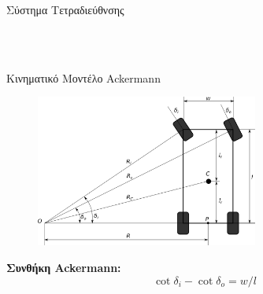 \documentclass[10pt, compress, handout]{beamer} %
\begin{document}
\begin{frame}{Σύστημα Τετραδιεύθνσης}
	\begin{figure}
		\centering
		 \\[0.15cm]
		\hspace{0.5cm}
		 \\[0.05cm]
	\end{figure}
\end{frame}

\begin{frame}{Κινηματικό Μοντέλο Ackermann}
	\begin{figure}
		\includegraphics[height=5cm]{Figures/ackermann_model.png}
	\end{figure}
	\textbf{Συνθήκη Ackermann: }
	\begin{equation*}
		\cot{\delta_i} - \cot{\delta_o} = w / l
	\end{equation*}
\end{frame}
\end{document}
